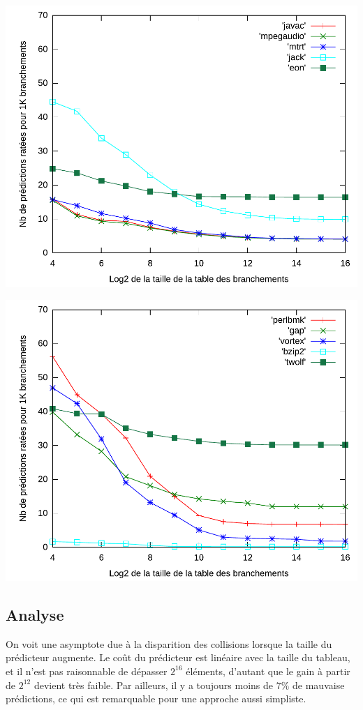 \documentclass[a4paper]{article}
\begin{document}
\begin{minipage}{.48\linewidth}
\includegraphics[width=\linewidth]{1-bit-2}
\end{minipage}%
\hfill
\begin{minipage}{.48\linewidth}
\includegraphics[width=\linewidth]{1-bit-3}
\end{minipage}
\subsection{Analyse}
On voit une asymptote due à la disparition des collisions lorsque la taille du prédicteur augmente.
Le coût du prédicteur est linéaire avec la taille du tableau, et il n'est pas raisonnable de dépasser $2^{16}$ éléments, d'autant que le gain à partir de $2^{12}$ devient très faible.
Par ailleurs, il y a toujours moins de $7\%$ de mauvaise prédictions, ce qui est remarquable pour une approche aussi simpliste.
\end{document}
